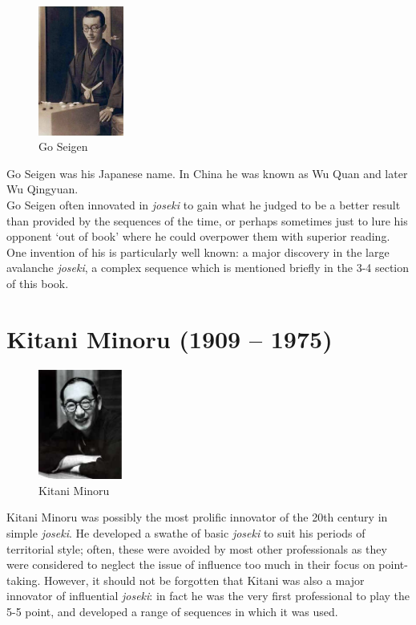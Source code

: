 \documentclass[a5paper,12pt,twoside]{book} %
\newcounter{joseki}                 %
\begin{document}
\begin{figure}
\centering
\includegraphics[width=0.25\textwidth]{GoSeigen.eps}
\caption*{\label{fig:Seigen}Go Seigen}
\end{figure}

Go Seigen was his Japanese name. In China he was known as Wu Quan and later Wu Qingyuan.\\

Go Seigen often innovated in \textit{joseki} to gain what he judged to be a better result than provided by the sequences of the time, or perhaps sometimes just to lure his opponent `out of book' where he could overpower them with superior reading. One invention of his is particularly well known: a major discovery in the large avalanche \textit{joseki}, a complex sequence which is mentioned briefly in the 3-4 section of this book.\\

\clearpage

\section*{Kitani Minoru (1909 – 1975)}

\begin{figure}
\centering
\includegraphics[width=0.25\textwidth]{kitani.eps}
\caption*{\label{fig:Kitani}Kitani Minoru}
\end{figure}

Kitani Minoru was possibly the most prolific innovator of the 20th century in simple \textit{joseki}. He developed a swathe of basic \textit{joseki} to suit his periods of territorial style; often, these were avoided by most other professionals as they were considered to neglect the issue of influence too much in their focus on point-taking. However, it should not be forgotten that Kitani was also a major innovator of influential \textit{joseki}: in fact he was the very first professional to play the 5-5 point, and developed a range of sequences in which it was used.\\
\end{document}

